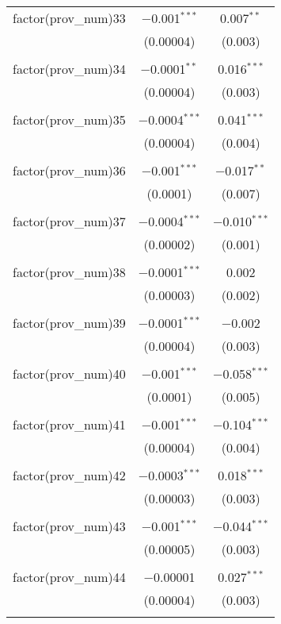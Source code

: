 \begin{table}[ht!]
\begin{tabular}{@{\extracolsep{5pt}}lcc}
 factor(prov\_num)33 & $-$0.001$^{***}$ & 0.007$^{**}$ \\ 
  & (0.00004) & (0.003) \\ 
  & & \\ 
 factor(prov\_num)34 & $-$0.0001$^{**}$ & 0.016$^{***}$ \\ 
  & (0.00004) & (0.003) \\ 
  & & \\ 
 factor(prov\_num)35 & $-$0.0004$^{***}$ & 0.041$^{***}$ \\ 
  & (0.00004) & (0.004) \\ 
  & & \\ 
 factor(prov\_num)36 & $-$0.001$^{***}$ & $-$0.017$^{**}$ \\ 
  & (0.0001) & (0.007) \\ 
  & & \\ 
 factor(prov\_num)37 & $-$0.0004$^{***}$ & $-$0.010$^{***}$ \\ 
  & (0.00002) & (0.001) \\ 
  & & \\ 
 factor(prov\_num)38 & $-$0.0001$^{***}$ & 0.002 \\ 
  & (0.00003) & (0.002) \\ 
  & & \\ 
 factor(prov\_num)39 & $-$0.0001$^{***}$ & $-$0.002 \\ 
  & (0.00004) & (0.003) \\ 
  & & \\ 
 factor(prov\_num)40 & $-$0.001$^{***}$ & $-$0.058$^{***}$ \\ 
  & (0.0001) & (0.005) \\ 
  & & \\ 
 factor(prov\_num)41 & $-$0.001$^{***}$ & $-$0.104$^{***}$ \\ 
  & (0.00004) & (0.004) \\ 
  & & \\ 
 factor(prov\_num)42 & $-$0.0003$^{***}$ & 0.018$^{***}$ \\ 
  & (0.00003) & (0.003) \\ 
  & & \\ 
 factor(prov\_num)43 & $-$0.001$^{***}$ & $-$0.044$^{***}$ \\ 
  & (0.00005) & (0.003) \\ 
  & & \\ 
 factor(prov\_num)44 & $-$0.00001 & 0.027$^{***}$ \\ 
  & (0.00004) & (0.003) \\ 
  & & \\ 

\end{tabular}
\end{table}
